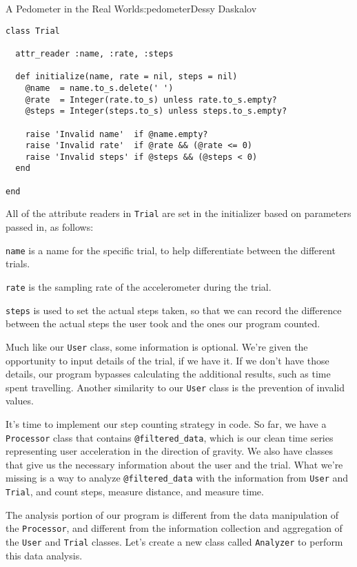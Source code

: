 \begin{aosachapter}{A Pedometer in the Real World}{s:pedometer}{Dessy Daskalov}
\begin{verbatim}
class Trial

  attr_reader :name, :rate, :steps

  def initialize(name, rate = nil, steps = nil)
    @name  = name.to_s.delete(' ')
    @rate  = Integer(rate.to_s) unless rate.to_s.empty?
    @steps = Integer(steps.to_s) unless steps.to_s.empty?

    raise 'Invalid name'  if @name.empty?
    raise 'Invalid rate'  if @rate && (@rate <= 0)
    raise 'Invalid steps' if @steps && (@steps < 0)
  end

end
\end{verbatim}

All of the attribute readers in \texttt{Trial} are set in the
initializer based on parameters passed in, as follows:

\begin{aosaitemize}

\item
  \texttt{name} is a name for the specific trial, to help differentiate
  between the different trials.
\item
  \texttt{rate} is the sampling rate of the accelerometer during the
  trial.
\item
  \texttt{steps} is used to set the actual steps taken, so that we can
  record the difference between the actual steps the user took and the
  ones our program counted.
\end{aosaitemize}

Much like our \texttt{User} class, some information is optional. We're
given the opportunity to input details of the trial, if we have it. If
we don't have those details, our program bypasses calculating the
additional results, such as time spent travelling. Another similarity to
our \texttt{User} class is the prevention of invalid values.

\label{steps-taken}

It's time to implement our step counting strategy in code. So far, we
have a \texttt{Processor} class that contains \texttt{@filtered\_data},
which is our clean time series representing user acceleration in the
direction of gravity. We also have classes that give us the necessary
information about the user and the trial. What we're missing is a way to
analyze \texttt{@filtered\_data} with the information from \texttt{User}
and \texttt{Trial}, and count steps, measure distance, and measure time.

The analysis portion of our program is different from the data
manipulation of the \texttt{Processor}, and different from the
information collection and aggregation of the \texttt{User} and
\texttt{Trial} classes. Let's create a new class called
\texttt{Analyzer} to perform this data analysis.


\end{aosachapter}
